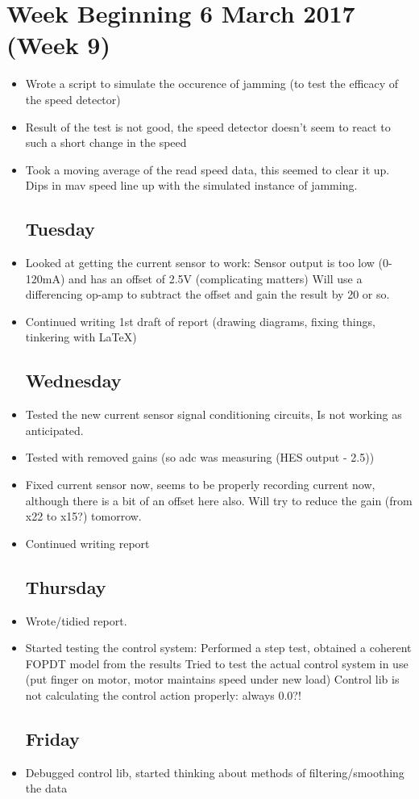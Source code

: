 \documentclass[a4]{report}
\def\mon{\subsection*{Monday}}
\def\tue{\subsection*{Tuesday}}
\def\wed{\subsection*{Wednesday}}
\def\thu{\subsection*{Thursday}}
\def\fri{\subsection*{Friday}}
\begin{document}
	\section{Week Beginning 6 March 2017 (Week 9)}
	\begin{itemize}
		\mon
		\item Wrote a script to simulate the occurence of jamming (to test the efficacy of the speed detector)
		\item Result of the test is not good, the speed detector doesn't seem to react to such a short change in the speed
		\item Took a moving average of the read speed data, this seemed to clear it up. Dips in mav speed line up with the simulated instance of jamming.
		\tue
		\item Looked at getting the current sensor to work:
		\subitem Sensor output is too low (0-120mA) and has an offset of 2.5V (complicating matters)
		\subitem Will use a differencing op-amp to subtract the offset and gain the result by 20 or so.
		\item Continued writing 1st draft of report (drawing diagrams, fixing things, tinkering with \LaTeX)
		\wed
		\item Tested the new current sensor signal conditioning circuits, Is not working as anticipated.
		\item Tested with removed gains (so adc was measuring (HES output - 2.5))
		\item Fixed current sensor now, seems to be properly recording current now, although there is a bit of an offset here also. Will try to reduce the gain (from x22 to x15?) tomorrow.
		\item Continued writing report
		\thu
		\item Wrote/tidied report.
		\item Started testing the control system:
		\subitem Performed a step test, obtained a coherent FOPDT model from the results
		\subitem Tried to test the actual control system in use (put finger on motor, motor maintains speed under new load)
		\subitem Control lib is not calculating the control action properly: always 0.0?!
		\fri
		\item Debugged control lib, started thinking about methods of filtering/smoothing the data
	\end{itemize}
	\newpage
\end{document}
